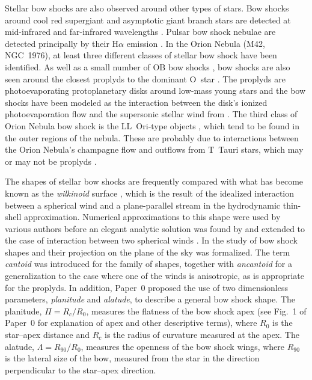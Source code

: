 Stellar bow shocks are also observed around other types of stars. Bow
shocks around cool red supergiant and asymptotic giant branch stars
are detected at mid-infrared and far-infrared wavelengths
\citep{Ueta:2006a, Ueta:2008a, Sahai:2010a, Cox:2012a}.  Pulsar bow
shock nebulae are detected principally by their H\(\alpha\) emission
\citep{Kulkarni:1988a, Brownsberger:2014a}.  In the Orion Nebula (M42,
NGC~1976), at least three different classes of stellar bow shock have
been identified. As well as a small number of OB bow shocks
\citep{Smith:2005a, ODell:2001c}, bow shocks are also seen around the
closest proplyds to the dominant O~star \thC{} \citep{Hayward:1994a,
  Bally:1998a, Robberto:2005a}.  The proplyds \citep{ODell:2008b} are
photoevaporating protoplanetary disks around low-mass young stars
\citep{Johnstone:1998a} and the bow shocks have been modeled as the
interaction between the disk's ionized photoevaporation flow and the
supersonic stellar wind from \thC{} \citep{Garcia-Arredondo:2001a}.
The third class of Orion Nebula bow shock is the LL~Ori-type objects
\citetext{\citealp{Gull:1979a}; \S~5 of \citealp{Bally:2000a}; \S~3.2
  of \citealp{Bally:2001a}; \citealp{Henney:2013a}}, which tend to be
found in the outer regions of the nebula.  These are probably due to
interactions between the Orion Nebula's champagne flow
\citep{Zuckerman:1973a} and outflows from T~Tauri stars, which may or
may not be proplyds \citep{Bally:2000a, Gutierrez-Soto:2015a}.

The shapes of stellar bow shocks are frequently compared with what has
become known as the \textit{wilkinoid} surface \citep{Cox:2012a},
which is the result of the idealized interaction between a spherical
wind and a plane-parallel stream in the hydrodynamic thin-shell
approximation.  Numerical approximations to this shape were used by
various authors \citep{Baranov:1971a, Mac-Low:1991a} before an elegant
analytic solution was found by \citet{Wilkin:1996a} and extended to
the case of interaction between two spherical winds
\citep{Canto:1996}.  In \citet[hereafter, Paper~0]{Tarango-Yong:2018a}
the study of bow shock shapes and their projection on the plane of the
sky was formalized. The term \textit{cantoid} was introduced for the
\citet{Canto:1996} family of shapes, together with \textit{ancantoid}
for a generalization to the case where one of the winds is
anisotropic, as is appropriate for the proplyds.  In addition, Paper~0
proposed the use of two dimensionless parameters, \textit{planitude}
and \textit{alatude}, to describe a general bow shock shape.  The
planitude, \(\Pi = R_c / R_0\), measures the flatness of the bow shock
apex (see Fig.~1 of Paper~0 for explanation of apex and other
descriptive terms), where \(R_0\) is the star--apex distance and
\(R_c\) is the radius of curvature measured at the apex.  The alatude,
\(\Lambda = R_{90}/R_0\), measures the openness of the bow shock wings,
where \(R_{90}\) is the lateral size of the bow, measured from the
star in the direction perpendicular to the star--apex direction.


